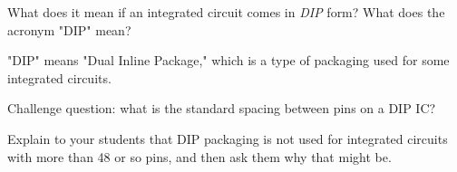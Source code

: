 

What does it mean if an integrated circuit comes in {\it DIP} form?  What does the acronym "DIP" mean?







"DIP" means "Dual Inline Package," which is a type of packaging used for some integrated circuits.

\vskip 10pt

Challenge question: what is the standard spacing between pins on a DIP IC?







Explain to your students that DIP packaging is not used for integrated circuits with more than 48 or so pins, and then ask them why that might be.




